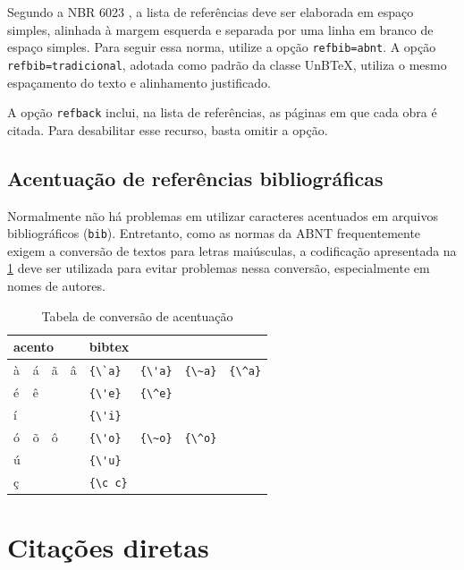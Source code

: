 Segundo a NBR 6023 \cite[p. 5]{NBR6023:2025}, a lista de referências deve ser elaborada em espaço simples, alinhada à margem esquerda e separada por uma linha em branco de espaço simples. Para seguir essa norma, utilize a opção \texttt{refbib=abnt}. A opção \texttt{refbib=tradicional}, adotada como padrão da classe UnB\TeX, utiliza o mesmo espaçamento do texto e alinhamento justificado.

A opção \texttt{refback} inclui, na lista de referências, as páginas em que cada obra é citada. Para desabilitar esse recurso, basta omitir a opção.

\subsection{Acentuação de referências bibliográficas}

Normalmente não há problemas em utilizar caracteres acentuados em arquivos bibliográficos (\texttt{bib}). Entretanto, como as normas da ABNT frequentemente exigem a conversão de textos para letras maiúsculas, a codificação apresentada na \cref{tab:acentos} deve ser utilizada para evitar problemas nessa conversão, especialmente em nomes de autores.

\begin{table}[htb]
\centering
\caption{Tabela de conversão de acentuação}
\label{tab:acentos}
\begin{tabular}{llllllll} \toprule
\multicolumn{4}{l}{acento} & \multicolumn{4}{l}{bibtex} \\ \midrule
\`a & \'a & \~a & \^a & \verb|{\`a}| & \verb|{\'a}| & \verb|{\~a}| & \verb|{\^a}| \\
\'e & \^e & & & \verb|{\'e}| & \verb|{\^e}| & & \\
\'i & & & & \verb|{\'i}| & & & \\
\'o & \~o & \^o & & \verb|{\'o}| & \verb|{\~o}| & \verb|{\^o}| & \\
\'u & & & & \verb|{\'u}| & & & \\
{\c c} & & & & \verb|{\c c}| & & & \\ \bottomrule
\end{tabular}
\end{table}

\section{Citações diretas}\label{sec:citacao}

